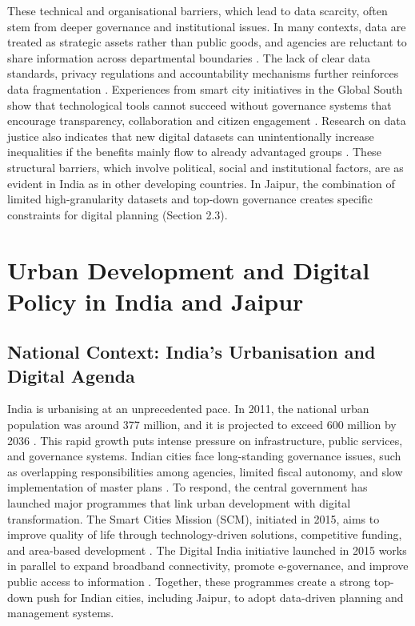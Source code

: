 \documentclass[
  12pt,
  oneside]{book}
\begin{document}
These technical and organisational barriers, which lead to data scarcity, often stem from deeper governance and institutional issues. In many contexts, data are treated as strategic assets rather than public goods, and agencies are reluctant to share information across departmental boundaries \autocite{yuKeyChallengesPotential2024}. The lack of clear data standards, privacy regulations and accountability mechanisms further reinforces data fragmentation \autocite{kvalvikTechnologySmartCities2022}. Experiences from smart city initiatives in the Global South show that technological tools cannot succeed without governance systems that encourage transparency, collaboration and citizen engagement \autocite{meijerGoverningSmartCity2016,senguptaSDG11SmartCities2022}. Research on data justice also indicates that new digital datasets can unintentionally increase inequalities if the benefits mainly flow to already advantaged groups \autocite{heeksDataficationDevelopmentMarginalised2019,brahmbhattUrbanSlumsDatafying2019}. These structural barriers, which involve political, social and institutional factors, are as evident in India as in other developing countries. In Jaipur, the combination of limited high-granularity datasets and top-down governance creates specific constraints for digital planning (Section 2.3).

\section{Urban Development and Digital Policy in India and Jaipur}\label{urban-development-and-digital-policy-in-india-and-jaipur}

\subsection{National Context: India's Urbanisation and Digital Agenda}\label{national-context-indias-urbanisation-and-digital-agenda}

India is urbanising at an unprecedented pace. In 2011, the national urban population was around 377 million, and it is projected to exceed 600 million by 2036 \autocite{GearingIndiasRapid2024}. This rapid growth puts intense pressure on infrastructure, public services, and governance systems. Indian cities face long-standing governance issues, such as overlapping responsibilities among agencies, limited fiscal autonomy, and slow implementation of master plans \autocite{ghoshUrbanChallengesIndia2014,singhCitizensParticipationUrban2013}. To respond, the central government has launched major programmes that link urban development with digital transformation. The Smart Cities Mission (SCM), initiated in 2015, aims to improve quality of life through technology-driven solutions, competitive funding, and area-based development \autocite{theministryofhousingandurbanaffairsmohuaSmartCitiesSmartcities2015}. The Digital India initiative launched in 2015 works in parallel to expand broadband connectivity, promote e-governance, and improve public access to information \autocite{ministryofelectronics&itUsDigitalIndia2015}. Together, these programmes create a strong top-down push for Indian cities, including Jaipur, to adopt data-driven planning and management systems.
\end{document}

